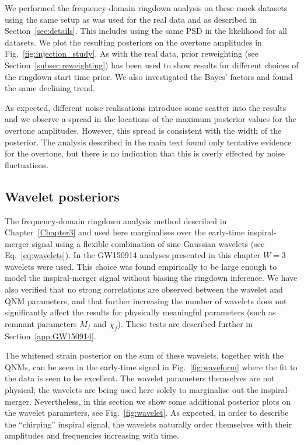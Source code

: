 We performed the frequency-domain ringdown analysis on these mock datasets using the same setup as was used for the real data and as described in Section~\ref{sec:details}.
This includes using the same PSD in the likelihood for all datasets.
We plot the resulting posteriors on the overtone amplitudes in Fig.~\ref{fig:injection_study}.
As with the real data, prior reweighting (see Section~\ref{subsec:reweighting}) has been used to show results for different choices of the ringdown start time prior.
We also investigated the Bayes' factors and found the same declining trend.

As expected, different noise realisations introduce some scatter into the results and we observe a spread in the locations of the maximum posterior values for the overtone amplitudes. 
However, this spread is consistent with the width of the posterior. 
The analysis described in the main text found only tentative evidence for the overtone, but there is no indication that this is overly effected by noise fluctuations.


\subsection{Wavelet posteriors}\label{app:W3}

The frequency-domain ringdown analysis method described in Chapter~\ref{Chapter3} and used here marginalises over the early-time inspiral-merger signal using a flexible combination of sine-Gaussian wavelets (see Eq.~\ref{eq:wavelets}).
In the GW150914 analyses presented in this chapter $W=3$ wavelets were used.
This choice was found empirically to be large enough to model the inspiral-merger signal without biasing the ringdown inference.
We have also verified that no strong correlations are observed between the wavelet and QNM parameters, and that further increasing the number of wavelets does not significantly affect the results for physically meaningful parameters (such as remnant parameters $M_f$ and $\chi_f$). 
These tests are described further in Section~\ref{app:GW150914}.

The whitened strain posterior on the sum of these wavelets, together with the QNMs, can be seen in the early-time signal in Fig.~\ref{fig:waveform} where the fit to the data is seen to be excellent.
The wavelet parameters themselves are not physical; the wavelets are being used here solely to marginalise out the inspiral-merger. 
Nevertheless, in this section we show some additional posterior plots on the wavelet parameters, see Fig.~\ref{fig:wavelet}.
As expected, in order to describe the ``chirping'' inspiral signal, the wavelets naturally order themselves with their amplitudes and frequencies increasing with time. 

